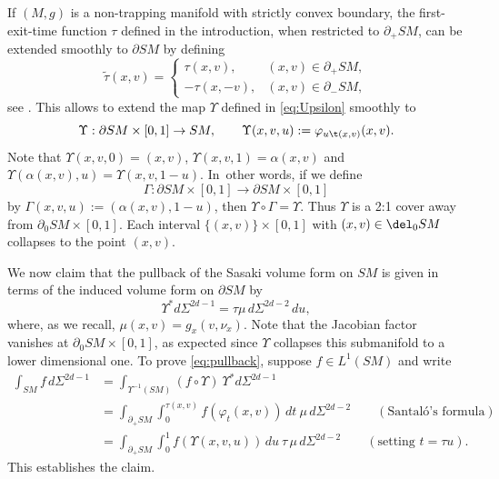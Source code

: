 If $(M,g)$ is a non-trapping manifold with strictly convex boundary, the first-exit-time function $\tau$ defined in the introduction, when restricted to $\partial_+ SM$, can be extended smoothly to $\partial SM$ by defining
\begin{equation}
\tilde{\tau}(x,v)=
\begin{cases}
\tau(x,v), &(x,v)\in\partial_{+}SM,\\
-\tau(x,-v), &(x,v)\in\partial_{-}SM,
\end{cases}
\label{eq:ttau}
\end{equation}
see \eg \cite[Lem.\,3.2.6]{Paternain2021}. This allows to extend the map $\Upsilon$ defined in \eqref{eq:Upsilon} smoothly to
\[
\Upsilon:\partial SM\times [0,1]\to SM, \qquad \Upsilon(x,v,u):=\varphi_{u\t(x,v)}(x,v).
\]
Note that $\Upsilon(x,v,0)=(x,v)$, $\Upsilon(x,v,1)=\alpha(x,v)$
and \hbox{$\Upsilon(\alpha(x,v),u)=\Upsilon(x,v,1-u)$}. In~other words, if we define
\[
\Gamma:\partial SM\times [0,1]\to\partial SM \times [0,1]
\]
by
$\Gamma(x,v,u):=(\alpha(x,v),1-u)$, then $\Upsilon\circ \Gamma=\Upsilon$.
Thus $\Upsilon$ is a 2:1 cover away from $\partial_0 SM\times[0,1]$. Each interval $\{(x,v)\} \times [0,1]$
with $(x,v) \in \del_0 SM$ collapses to the point $(x,v)$.

We now claim that the pullback of the Sasaki volume form on $SM$ is given in terms of the induced volume form on $\partial SM$ by
\begin{equation}
\Upsilon^* d\Sigma^{2d-1} = \tau\mu\,d\Sigma^{2d-2}\,du,
\label{eq:pullback}
\end{equation}
where, as we recall, $\mu(x,v) = g_x(v, \nu_x)$. Note that the Jacobian factor vanishes at $\partial_0 SM \times [0,1]$, as expected
since $\Upsilon$ collapses this submanifold to a lower dimensional one. To prove \eqref{eq:pullback}, suppose $f\in L^1(SM)$ and write\vspace*{-3pt}
\begin{align*}
\int_{SM} f\,d\Sigma^{2d-1} &= \int_{\Upsilon^{-1} (SM)} (f\circ \Upsilon)\ \Upsilon^* d\Sigma^{2d-1}\\
&= \int_{\partial_+ SM} \int_0^{\tau(x,v)} f(\varphi_t(x,v))\,dt\ \mu \, d\Sigma^{2d-2} \qquad (\text{Santaló's formula}) \\
&
= \int_{\partial_+ SM} \int_0^1 f(\Upsilon(x,v,u)) \,du\ \tau \, \mu \, d\Sigma^{2d-2} \qquad (\text{setting } t = \tau u).
\end{align*}
This establishes the claim.

